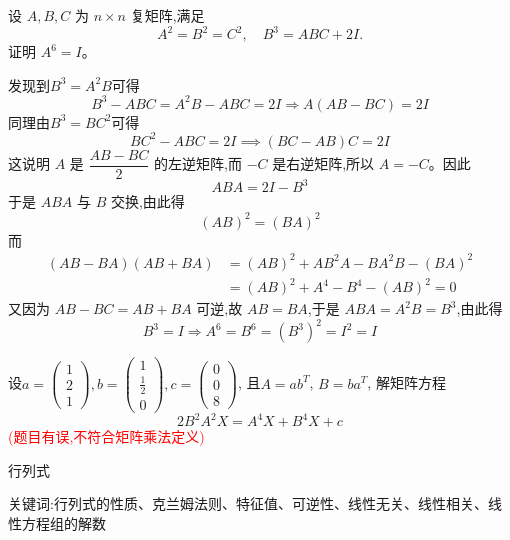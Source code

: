 \begin{questions}
    \question 设 $A,B,C$ 为 $n \times n$ 复矩阵,满足
    \[
    A^2 = B^2 = C^2, \quad B^3 = ABC + 2I.
    \]
    证明 $A^6 = I$。
    \begin{solution}
        发现到$B^3=A^2B$可得
        \[
        B^3 - ABC = A^2B - ABC = 2I \Rightarrow A(AB - BC) = 2I
        \]
        同理由$B^3=BC^2$可得
        \[
        BC^2 - ABC = 2I \implies (BC - AB)C = 2I
        \]
        这说明 $A$ 是 $\dfrac{AB - BC}{2}$ 的左逆矩阵,而 $-C$ 是右逆矩阵,所以 $A = -C$。因此
        \[
        ABA = 2I- B^3
        \]
        于是 $ABA$ 与 $B$ 交换,由此得 
        \[
        (AB)^2 = (BA)^2
        \]
        而
        \begin{align*}
        (AB - BA)(AB + BA) &= (AB)^2 + AB^2A - BA^2B - (BA)^2 \\
        &= (AB)^2 + A^4 - B^4 - (AB)^2 = 0
        \end{align*}
        又因为 $AB - BC = AB + BA$ 可逆,故 $AB = BA$,于是 $ABA = A^2B = B^3$,由此得
        \[
        B^3 = I \Rightarrow A^6 = B^6 = (B^3)^2 = I^2 = I
        \]
    \end{solution}

    \question 设$a=\begin{pmatrix} 1 \\ 2 \\ 1 \end{pmatrix},b=\begin{pmatrix} 1 \\ \frac12 \\ 0 \end{pmatrix}, c=\begin{pmatrix} 0 \\ 0 \\ 8 \end{pmatrix}$, 且$A=ab^T$, $B=ba^T$, 解矩阵方程$$2B^2 A^2 X = A^4 X + B^4 X + c$$\textcolor{red}{(题目有误,不符合矩阵乘法定义)}

\end{questions}
\pagebreak

\begin{center}
  {\fontsize{30pt}{26pt}\selectfont
    \hypertarget{行列式}{行列式} \label{行列式}
  }
\end{center}
\separator
\begin{center}
    关键词:行列式的性质、克兰姆法则、特征值、可逆性、线性无关、线性相关、线性方程组的解数
\end{center}
\vspace{0.5pt}

